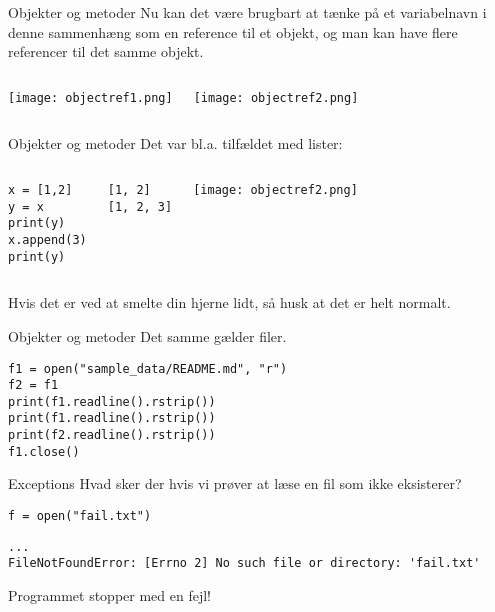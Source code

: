 \begin{frame}[fragile]{Objekter og metoder}
Nu kan det være brugbart at tænke på et variabelnavn i denne sammenhæng  som en reference til et objekt, og man kan have flere referencer til det samme objekt.

\begin{columns}
\texttt{[image: objectref1.png]}
	
	\pause
	
\texttt{[image: objectref2.png]}
\end{columns}

\end{frame}

\begin{frame}[fragile]{Objekter og metoder}
Det var bl.a. tilfældet med lister:

\begin{columns}
	\begin{lstlisting}[style=python]
x = [1,2]
y = x
print(y)
x.append(3)
print(y)
	\end{lstlisting}
	
	\pause
	
	\begin{lstlisting}[style=python]
[1, 2]
[1, 2, 3]
	\end{lstlisting}
	\texttt{[image: objectref2.png]}
	
\end{columns}

\pause

Hvis det er ved at smelte din hjerne lidt, så husk at det er helt normalt.
\end{frame}

\begin{frame}[fragile]{Objekter og metoder}
Det samme gælder filer.

	\begin{lstlisting}[style=python]
f1 = open("sample_data/README.md", "r")
f2 = f1
print(f1.readline().rstrip())
print(f1.readline().rstrip())
print(f2.readline().rstrip())
f1.close()
	\end{lstlisting}

\end{frame}


\begin{frame}[fragile]{Exceptions}
Hvad sker der hvis vi prøver at læse en fil som ikke eksisterer?

\begin{lstlisting}[style=python]
f = open("fail.txt")
\end{lstlisting}

\pause

\begin{lstlisting}[style=python]
...
FileNotFoundError: [Errno 2] No such file or directory: 'fail.txt'
\end{lstlisting}

Programmet stopper med en fejl!

\end{frame}


